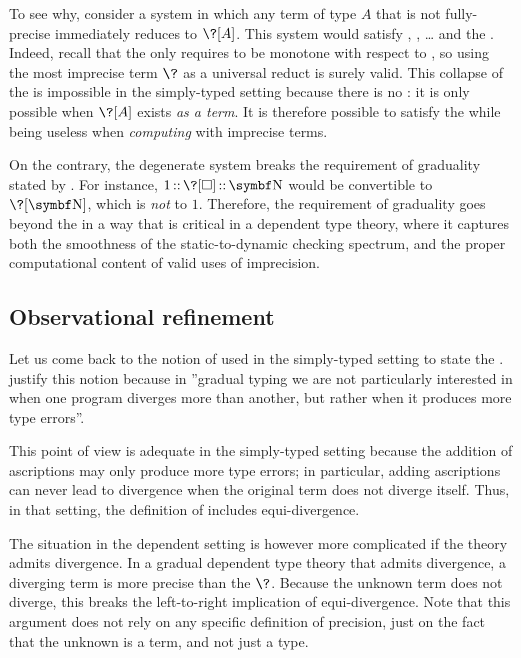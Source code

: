 To see why, consider a system in which any term of type $A$ that is not
fully-precise immediately reduces to $\?[A]$.
This system would satisfy , , …
and the . Indeed, recall that the  only requires 
to be monotone with respect to , so using the most imprecise term
$\?$ as a universal reduct is surely valid. This collapse of the 
is impossible in the simply-typed setting because there is no :
it is only possible when $\?[A]$ exists \emph{as a term}.
It is therefore possible to satisfy the  while being useless when
\emph{computing} with imprecise terms.

On the contrary, the degenerate system breaks the  requirement of graduality stated by .
For instance, $\asc{\asc{1}{\?[\uni]}}{\Nat}$ would be convertible to $\?[\Nat]$,
which is \emph{not}  to $1$.
Therefore, the  requirement of graduality goes beyond the
 in a way that is critical in a dependent type theory,
where it captures both the smoothness of the static-to-dynamic checking spectrum,
and the proper computational content of valid uses of imprecision.

\subsection{Observational refinement}

Let us come back to the notion of  used in the simply-typed setting to state the
.
\textcite{New2018} justify this notion because in
”gradual typing we are not particularly interested in
when one program diverges more than another, but rather when it
produces more type errors”.

%
This point of view is adequate in the simply-typed setting because
the addition of ascriptions may only produce more type errors; in particular, 
adding ascriptions can never lead to divergence
when the original term does not diverge itself.
%
Thus, in that setting, the definition of 
includes equi-divergence.
%

The situation in the dependent setting is however more
complicated if the theory admits divergence.%
%
%
In a gradual dependent type theory that admits divergence,
a diverging term is more precise than the
 $\?$. Because the unknown term does not diverge, this
breaks the left-to-right implication of
equi-divergence. Note that this argument does not rely on any specific definition of precision, 
just on the fact that the unknown is a term, and not just a type.

